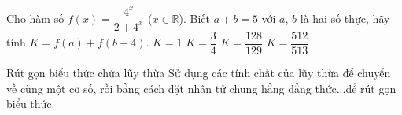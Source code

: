 	\begin{ex}
		Cho hàm số $f(x)=\dfrac{4^x}{2+4^x}$ ($x\in\mathbb{R}$). Biết $a+b=5$ với $a$, $b$ là hai số thực, hãy tính $K=f(a)+f(b-4)$.
		\choice
		{\True $K=1$}
		{$K=\dfrac{3}{4}$}
		{$K=\dfrac{128}{129}$}
		{$K=\dfrac{512}{513}$}
	\end{ex}
	\setcounter{subsubsection}{0}
	\setcounter{ex}{0}
	\setcounter{bt}{0}
\begin{dang}{Rút gọn biểu thức chứa lũy thừa}
	Sử dụng các tính chất của lũy thừa để chuyển về cùng một cơ số, rồi bằng cách đặt nhân tử chung hằng đẳng thức...để rút gọn biểu thức.
\end{dang}
